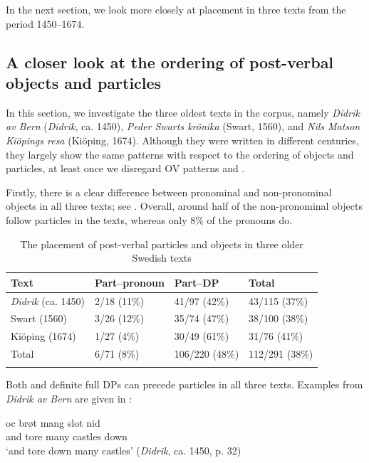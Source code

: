 \documentclass[output=paper]{langscibook}
\begin{document}
In the next section, we look more closely at  placement in three texts from the period 1450–1674.


\subsection{A closer look at the ordering of post-verbal objects and particles}\label{sec:lalu:4.2}

In this section, we investigate the three oldest texts in the corpus, namely \textit{Didrik av Bern} (\textit{Didrik}, ca. 1450), \textit{Peder Swarts krönika} (Swart, 1560), and \textit{Nils Matson Kiöpings resa} (Kiöping, 1674). Although they were written in different centuries, they largely show the same patterns with respect to the ordering of objects and particles, at least once we disregard OV patterns and  . 



Firstly, there is a clear difference between pronominal and non-pronominal objects in all three texts; see . Overall, around half of the non-pronominal objects follow particles in the texts, whereas only 8\% of the pronouns do.


\begin{table}
\caption{The placement of post-verbal particles and objects in three older Swedish texts}
\label{tab:lalu:1}
\begin{tabularx}{.9\textwidth}{lXXX}
\lsptoprule
Text & Part--pronoun & Part–DP & Total\\
\midrule
\textit{Didrik} (ca. 1450) & 2/18 (11\%) & 41/97 (42\%) & 43/115 (37\%)\\
Swart (1560) & 3/26 (12\%) & 35/74 (47\%) & 38/100 (38\%)\\
Kiöping (1674) & 1/27 (4\%) & 30/49 (61\%) & 31/76 (41\%)\\
\midrule
Total & 6/71 (8\%) & 106/220 (48\%) & 112/291 (38\%)\\
\lspbottomrule
\end{tabularx}
\end{table}

Both  and definite full DPs can precede particles in all three texts. Examples from \textit{Didrik av Bern} are given in :


\ea\label{ex:lalu:23}
\ea
\gll  oc     brøt   mang   slot       nid\\
    and     tore   many   castles   down \\
\glt `and tore down many castles’ (\textit{Didrik}, ca. 1450, p. 32)\\
\end{document}
